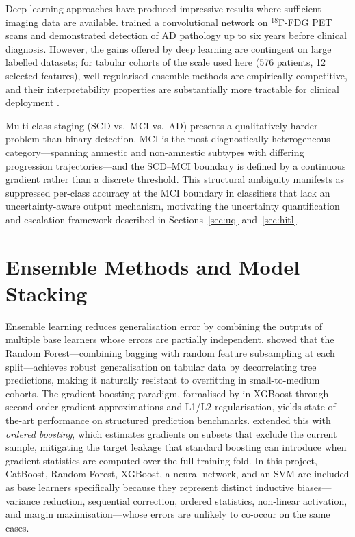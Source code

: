 Deep learning approaches have produced impressive results where sufficient
imaging data are available. \citet{ding2019deep} trained a convolutional network
on $^{18}$F-FDG PET scans and demonstrated detection of AD pathology up to six
years before clinical diagnosis. However, the gains offered by deep learning are
contingent on large labelled datasets; for tabular cohorts of the scale used
here (576 patients, 12 selected features), well-regularised ensemble methods
are empirically competitive, and their interpretability properties are
substantially more tractable for clinical deployment \citep{rathore2017review}.

Multi-class staging (SCD vs.\ MCI vs.\ AD) presents a qualitatively harder
problem than binary detection. MCI is the most diagnostically heterogeneous
category---spanning amnestic and non-amnestic subtypes with differing
progression trajectories---and the SCD--MCI boundary is defined by a continuous
gradient rather than a discrete threshold. This structural ambiguity manifests
as suppressed per-class accuracy at the MCI boundary in classifiers that lack an
uncertainty-aware output mechanism, motivating the uncertainty quantification
and escalation framework described in Sections~\ref{sec:uq} and~\ref{sec:hitl}.

\section{Ensemble Methods and Model Stacking}
\label{sec:ensemble}

Ensemble learning reduces generalisation error by combining the outputs of
multiple base learners whose errors are partially independent.
\citet{breiman2001random} showed that the Random Forest---combining bagging with
random feature subsampling at each split---achieves robust generalisation on
tabular data by decorrelating tree predictions, making it naturally resistant to
overfitting in small-to-medium cohorts. The gradient boosting paradigm,
formalised by \citet{chen2016xgboost} in XGBoost through second-order gradient
approximations and L1/L2 regularisation, yields state-of-the-art performance on
structured prediction benchmarks. \citet{prokhorenkova2018catboost} extended
this with \emph{ordered boosting}, which estimates gradients on subsets that
exclude the current sample, mitigating the target leakage that standard boosting
can introduce when gradient statistics are computed over the full training fold.
In this project, CatBoost, Random Forest, XGBoost, a neural network, and an SVM
are included as base learners specifically because they represent distinct
inductive biases---variance reduction, sequential correction, ordered
statistics, non-linear activation, and margin maximisation---whose errors are
unlikely to co-occur on the same cases.

